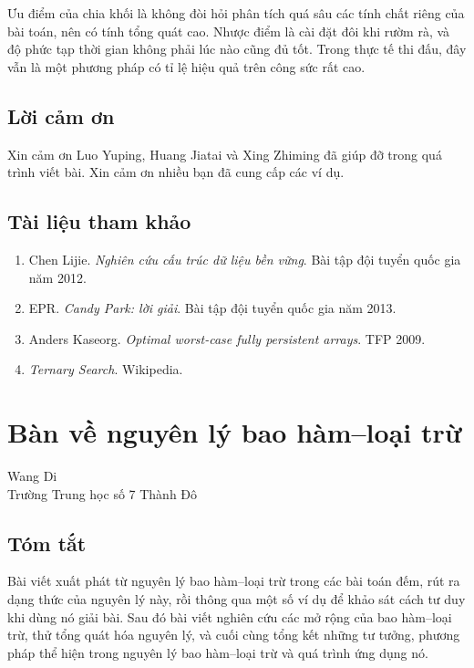 \documentclass[11pt]{article}
\begin{document}
Ưu điểm của chia khối là không đòi hỏi phân tích quá sâu các tính chất riêng
của bài toán, nên có tính tổng quát cao. Nhược điểm là cài đặt đôi khi rườm
rà, và độ phức tạp thời gian không phải lúc nào cũng đủ tốt. Trong thực tế
thi đấu, đây vẫn là một phương pháp có tỉ lệ hiệu quả trên công sức rất cao.

\subsection{Lời cảm ơn}

Xin cảm ơn Luo Yuping, Huang Jiatai và Xing Zhiming đã giúp đỡ trong quá
trình viết bài. Xin cảm ơn nhiều bạn đã cung cấp các ví dụ.

\subsection{Tài liệu tham khảo}

\begin{enumerate}
  \item Chen Lijie. \emph{Nghiên cứu cấu trúc dữ liệu bền vững}. Bài tập đội
  tuyển quốc gia năm 2012.
  \item EPR. \emph{Candy Park: lời giải}. Bài tập đội tuyển quốc gia năm
  2013.
  \item Anders Kaseorg. \emph{Optimal worst-case fully persistent arrays}.
  TFP 2009.
  \item \emph{Ternary Search}. Wikipedia.
\end{enumerate}

\section{Bàn về nguyên lý bao hàm--loại trừ}

\begin{center}
Wang Di\\
Trường Trung học số 7 Thành Đô
\end{center}

\subsection*{Tóm tắt}

Bài viết xuất phát từ nguyên lý bao hàm--loại trừ trong các bài toán đếm, rút
ra dạng thức của nguyên lý này, rồi thông qua một số ví dụ để khảo sát cách tư
duy khi dùng nó giải bài. Sau đó bài viết nghiên cứu các mở rộng của bao
hàm--loại trừ, thử tổng quát hóa nguyên lý, và cuối cùng tổng kết những tư
tưởng, phương pháp thể hiện trong nguyên lý bao hàm--loại trừ và quá trình ứng
dụng nó.
\end{document}
